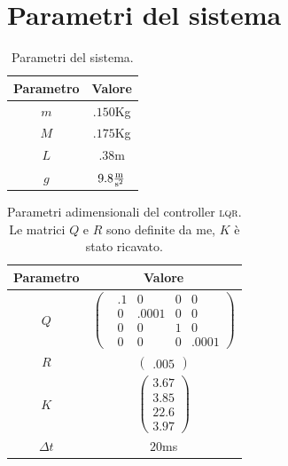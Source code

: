 \appendix
\section{Parametri del sistema}\label{sec:parametri-sistema}
\begin{table}[H]
  \centering
  \begin{tabular}[t]{cc}
    \toprule
    Parametro &Valore\\
    \midrule
    $m$ & $.150$Kg \\
    $M$ & $.175$Kg \\
    $L$ & $.38$m   \\
    $g$ & $9.8\frac {\text m}{\text {s}^2}$ \\
    \bottomrule
  \end{tabular}
  \caption{
    Parametri del sistema.
  }
  \label{tab:parametri-sistema}
\end{table}

\begin{table}[H]
  \centering
  \begin{tabular}[t]{cc}
    \toprule
    Parametro &Valore\\
    \midrule
    \vspace{5px}
    $Q$ & $\left(\begin{matrix}
                   &.1 &0 &0 &0 \\ &0 &.0001 &0 &0 \\ &0 &0 &1 &0 \\ &0 &0 &0 &.0001
    \end{matrix}\right)$ \\
    \vspace{5px}
    $R$ & $\left(\begin{matrix}
                   .005
    \end{matrix}\right)$ \\
    \vspace{5px}
    $K$ & $\left(\begin{matrix}
                   3.67 \\ 3.85 \\ 22.6 \\ 3.97
    \end{matrix}\right)$ \\
    $\Delta t$ & $20$ms \\
    \bottomrule
  \end{tabular}
  \caption{
    Parametri adimensionali del controller \textsc{lqr}. Le matrici $Q$ e $R$ sono definite da me, $K$ è stato ricavato.
  }
  \label{tab:coefficienti-lqr}
\end{table}

